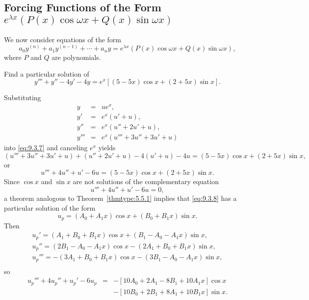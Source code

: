 \documentclass{ximera}
\begin{document}
\subsection*{Forcing Functions of the Form
$e^{\lambda x}\left(P(x)\cos\omega x+Q(x)\sin\omega x\right)$}

We  now consider equations of the form
$$
a_0y^{(n)}+a_1y^{(n-1)}+\cdots+a_ny=
e^{\lambda x}\left(P(x)\cos\omega x+Q(x)\sin\omega x\right),
$$
where $P$ and $Q$ are polynomials.

\begin{example}\label{example:9.3.3}
Find a particular solution of
\begin{equation} \label{eq:9.3.7}
y'''+y''-4y'-4y=e^x[(5-5x)\cos x+(2+5x)\sin x].
\end{equation}


\begin{explanation}
Substituting
\begin{eqnarray*}
y&=&ue^x,\\ y'&=&e^x(u'+u),\\
y''&=&e^x(u''+2u'+u),\\
y'''&=&e^x(u'''+3u''+3u'+u)
\end{eqnarray*}
into \eqref{eq:9.3.7} and canceling $e^x$ yields
$$
(u'''+3u''+3u'+u)+(u''+2u'+u)-4(u'+u)-4u
=(5-5x)\cos x+(2+5x)\sin x,
$$
or
\begin{equation} \label{eq:9.3.8}
u'''+4u''+u'-6u=(5-5x)\cos x+(2+5x)\sin x.
\end{equation}
Since $\cos x$ and $\sin x$ are not solutions of the complementary
equation
$$
u'''+4u''+u'-6u=0,
$$
a theorem analogous to Theorem~\ref{thmtype:5.5.1} implies that
\eqref{eq:9.3.8} has a particular solution of the form
\begin{equation} \label{eq:9.3.9}
u_p=(A_0+A_1x)\cos x+(B_0+B_1x)\sin x.
\end{equation}
Then
\begin{eqnarray*}
u_p'=(A_1+B_0+B_1x)\cos x+(B_1-A_0-A_1x)\sin x,\\
 u_p''=(2B_1-A_0-A_1x)\cos x-(2A_1+B_0+B_1x)\sin x,\\
 u_p'''=-(3A_1+B_0+B_1x)\cos x-(3B_1-A_0-A_1x)\sin x,\\
\end{eqnarray*}
so
$$
\begin{array}{rcl}
u_p'''+4u_p''+u_p'-6u_p&=&-\left[10A_0+2A_1-8B_1+10A_1x\right]\cos
x\\ &&- \left[10B_0+2B_1+8A_1+10B_1x\right]\sin x.
\end{array}
$$
\end{explanation}
\end{example}
\end{document}
